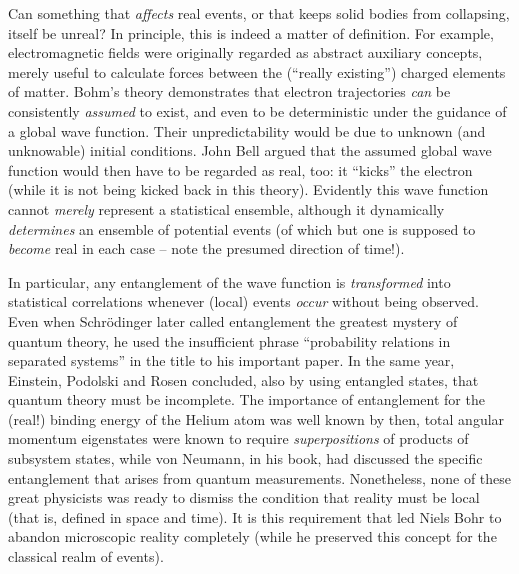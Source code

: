 Can something that {\it affects} real events, or that keeps
solid bodies from collapsing, itself be unreal? In principle, this is
indeed a matter of definition. For example, electromagnetic fields were
originally regarded as abstract auxiliary concepts, merely useful to
calculate forces between the (``really existing'') charged elements of
matter. Bohm's theory demonstrates that electron trajectories
{\it can} be consistently {\it assumed} to exist, and even to be
deterministic under the guidance of a global wave function. Their
unpredictability would be due to unknown (and unknowable) initial
conditions. John Bell \cite{Bell} argued that the assumed
global wave function would then have to be regarded as real, too: it
``kicks'' the electron (while it is not being kicked back in this
theory). Evidently this wave function cannot {\it merely} represent a
statistical ensemble, although it dynamically {\it determines} an
ensemble of potential events (of which but one is supposed to {\it
become} real in each case -- note the presumed direction of time!).

In particular, any entanglement of the wave function is
{\it transformed} into statistical correlations
whenever (local) events {\it occur} without being observed. Even when
Schr\"odinger \cite{Schr} later called entanglement the greatest
mystery of quantum theory, he used the insufficient phrase
``probability relations in separated systems'' in the title to his
important paper. In the same year, Einstein, Podolski and Rosen
  concluded, also by
using entangled states, that quantum theory must be incomplete. The
importance of entanglement for the (real!) binding energy of the Helium
atom was well known by then, total angular momentum eigenstates were
known to require {\it superpositions} of products of subsystem states,
while von Neumann, in his book, had discussed the specific
entanglement that arises from quantum measurements. Nonetheless, none
of these great physicists was ready to dismiss the condition that
reality must be local (that is, defined in space and time). It is this
requirement that led Niels Bohr to abandon microscopic reality
completely (while he preserved this concept for the classical realm of
events).

